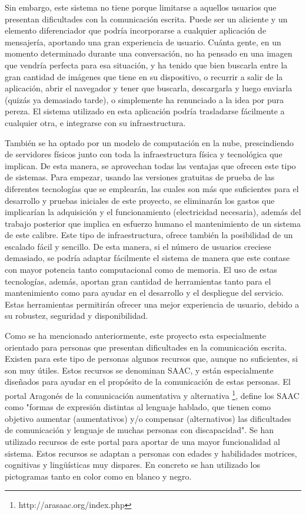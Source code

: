 Sin embargo, este sistema no tiene porque limitarse a aquellos usuarios que presentan dificultades con la comunicación escrita. Puede ser un aliciente y un elemento diferenciador que podría incorporarse a cualquier aplicación de mensajería, aportando una gran experiencia de usuario. Cuánta gente, en un momento determinado durante una conversación, no ha pensado en una imagen que vendría perfecta para esa situación, y ha tenido que bien buscarla entre la gran cantidad de imágenes que tiene en su dispositivo, o recurrir a salir de la aplicación, abrir el navegador y tener que buscarla, descargarla y luego enviarla (quizás ya demasiado tarde), o simplemente ha renunciado a la idea por pura pereza. El sistema utilizado en esta aplicación podría trasladarse fácilmente a cualquier otra, e integrarse con su infraestructura.

También se ha optado por un modelo de computación en la nube, prescindiendo de servidores físicos junto con toda la infraestructura física y tecnológica que implican. De esta manera, se aprovechan todas las ventajas que ofrecen este tipo de sistemas. Para empezar, usando las versiones gratuitas de prueba de las diferentes tecnologías que se emplearán, las cuales son más que suficientes para el desarrollo y pruebas iniciales de este proyecto, se eliminarán los gastos que implicarían la adquisición y el funcionamiento (electricidad necesaria), además del trabajo posterior que implica en esfuerzo humano el mantenimiento de un sistema de este calibre. Este tipo de infraestructura, ofrece también la posibilidad de un escalado fácil y sencillo. De esta manera, si el número de usuarios creciese demasiado, se podría adaptar fácilmente el sistema de manera que este contase con mayor potencia tanto computacional como de memoria. El uso de estas tecnologías, además, aportan gran cantidad de herramientas tanto para el mantenimiento como para ayudar en el desarrollo y el despliegue del servicio. Estas herramientas permitirán ofrecer una mejor experiencia de usuario, debido a su robustez, seguridad y disponibilidad.


Como se ha mencionado anteriormente, este proyecto esta especialmente orientado para personas que presentan dificultades en la comunicación escrita. Existen para este tipo de personas algunos recursos que, aunque no suficientes, si son muy útiles. Estos recursos se denominan \ac{SAAC}, y están especialmente diseñados para ayudar en el propósito de la comunicación de estas personas. El portal Aragonés de la comunicación aumentativa y alternativa \footnote{http://arasaac.org/index.php}, define los \ac{SAAC} como "formas de expresión distintas al lenguaje hablado, que tienen como objetivo aumentar (aumentativos) y/o compensar (alternativos) las dificultades de comunicación y lenguaje de muchas personas con discapacidad". Se han utilizado recursos de este portal para aportar de una mayor funcionalidad al sistema. Estos recursos se adaptan a personas con edades y habilidades motrices, cognitivas y lingüísticas muy dispares. En concreto se han utilizado los pictogramas tanto en color como en blanco y negro. 

